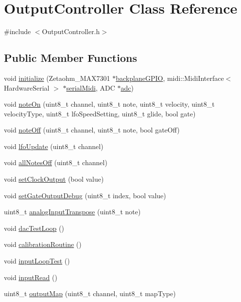 \hypertarget{class_output_controller}{}\section{Output\+Controller Class Reference}
\label{class_output_controller}


{\ttfamily \#include $<$Output\+Controller.\+h$>$}

\subsection*{Public Member Functions}
\begin{DoxyCompactItemize}
\item 
void \hyperlink{class_output_controller_a6c7741fe241177b6c0d1236df4c9d358}{initialize} (Zetaohm\+\_\+\+M\+A\+X7301 $\ast$\hyperlink{class_output_controller_ab0e2d4c6b94ea387857bd15cf8aec500}{backplane\+G\+P\+IO}, midi\+::\+Midi\+Interface$<$ Hardware\+Serial $>$ $\ast$\hyperlink{class_output_controller_a567ff7ec4d3681767234a68440e8f244}{serial\+Midi}, A\+DC $\ast$\hyperlink{class_output_controller_a9bfb0a095f159c515a688eb7883d8f2e}{adc})
\item 
void \hyperlink{class_output_controller_aa841a26dfccb827a5d9896ea6a57d4ff}{note\+On} (uint8\+\_\+t channel, uint8\+\_\+t note, uint8\+\_\+t velocity, uint8\+\_\+t velocity\+Type, uint8\+\_\+t lfo\+Speed\+Setting, uint8\+\_\+t glide, bool gate)
\item 
void \hyperlink{class_output_controller_afc6f2ff1d148a4ac60bc07b5829875eb}{note\+Off} (uint8\+\_\+t channel, uint8\+\_\+t note, bool gate\+Off)
\item 
void \hyperlink{class_output_controller_a561d7c84d91dcba6cfd9cd8b587b749f}{lfo\+Update} (uint8\+\_\+t channel)
\item 
void \hyperlink{class_output_controller_abd6a1e2af3b0e92a53f5e16292958c10}{all\+Notes\+Off} (uint8\+\_\+t channel)
\item 
void \hyperlink{class_output_controller_a4057f254aeb8e2d6eed51bc9f76eb2e2}{set\+Clock\+Output} (bool value)
\item 
void \hyperlink{class_output_controller_ab821df3ba8e657761c9ae53e4bda458a}{set\+Gate\+Output\+Debug} (uint8\+\_\+t index, bool value)
\item 
uint8\+\_\+t \hyperlink{class_output_controller_a0996e6ff4b474cc584d532f8b05416ac}{analog\+Input\+Transpose} (uint8\+\_\+t note)
\item 
void \hyperlink{class_output_controller_a858a11f23ccf69f351cefbb5b7cca8eb}{dac\+Test\+Loop} ()
\item 
void \hyperlink{class_output_controller_a08b99c2f97e05cebeab1cbc9f680d8a9}{calibration\+Routine} ()
\item 
void \hyperlink{class_output_controller_a3e855ce6665a2f127a2dc50d04ff0a1c}{input\+Loop\+Test} ()
\item 
void \hyperlink{class_output_controller_a67591d82e2c023450e42976bf68b1af1}{input\+Read} ()
\item 
uint8\+\_\+t \hyperlink{class_output_controller_af87eb8cce270ad31c3875208e36f9bc6}{output\+Map} (uint8\+\_\+t channel, uint8\+\_\+t map\+Type)
\end{DoxyCompactItemize}

